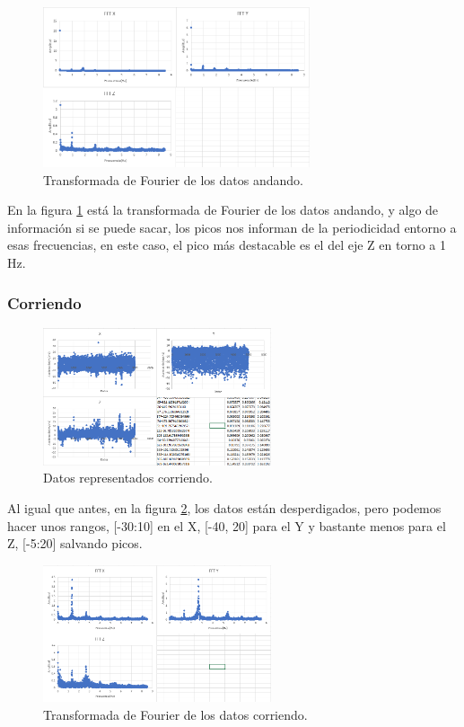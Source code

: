 \documentclass[12pt]{article}
\numberwithin{equation}{section}
\begin{document}
{\begin{figure}[h]
    \centering
    \includegraphics[width=0.7\textwidth]{andandofft.png}
    \caption{Transformada de Fourier de los datos andando.}
    \label{fig:andandofft}
\end{figure}

En la figura \ref{fig:andandofft} está la transformada de Fourier de los datos andando, y algo de información si se puede sacar, los picos nos informan de la periodicidad entorno a esas frecuencias, en este caso, el pico más destacable es el del eje Z en torno a 1 Hz.

\subsubsection{Corriendo}
\begin{figure}[h]
    \centering
    \includegraphics[width=0.6\textwidth]{corriendoraw.png}
    \caption{Datos representados corriendo.}
    \label{fig:corriendoraw}
\end{figure}

Al igual que antes, en la figura \ref{fig:corriendoraw}, los datos están desperdigados, pero podemos hacer unos rangos, [-30:10] en el X, [-40, 20] para el Y y bastante menos para el Z, [-5:20] salvando picos.
\begin{figure}[h]
    \centering
    \includegraphics[width=0.6\textwidth]{corriendofft.png}
    \caption{Transformada de Fourier de los datos corriendo.}
    \label{fig:corriendofft}
\end{figure}

}
\end{document}
